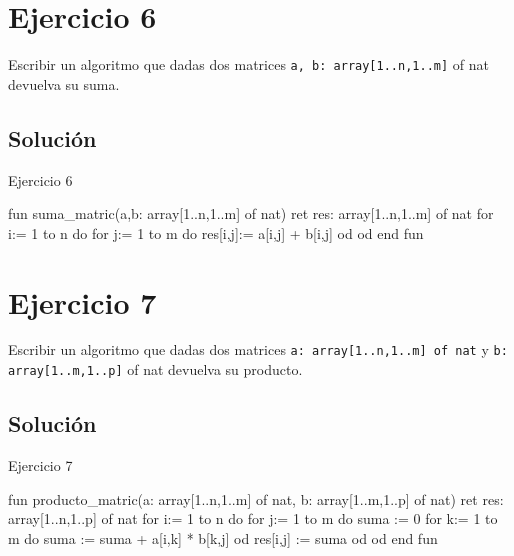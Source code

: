 \section{Ejercicio 6}
Escribir un algoritmo que dadas dos matrices \texttt{a, b: array[1..n,1..m]} of nat devuelva su suma.

\subsection{Solución}
\begin{codebox}{Ejercicio 6}
\begin{pascallike}
fun suma_matric(a,b: array[1..n,1..m] of nat) ret res: array[1..n,1..m] of nat
for i:= 1 to n do
    for j:= 1 to m do
        res[i,j]:= a[i,j] + b[i,j]
    od
od
end fun
\end{pascallike}
\end{codebox}

\section{Ejercicio 7}
Escribir un algoritmo que dadas dos matrices \texttt{a: array[1..n,1..m] of nat} y \texttt{b: array[1..m,1..p]} of nat devuelva su producto.

\subsection{Solución}
\begin{codebox}{Ejercicio 7}
\begin{pascallike}
fun producto_matric(a: array[1..n,1..m] of nat, b: array[1..m,1..p] of nat) 
    ret res: array[1..n,1..p] of nat
for i:= 1 to n do
    for j:= 1 to m do
        suma := 0
        for k:= 1 to m do 
            suma := suma + a[i,k] * b[k,j]
        od
        res[i,j] := suma
    od
od
end fun
\end{pascallike}
\end{codebox}